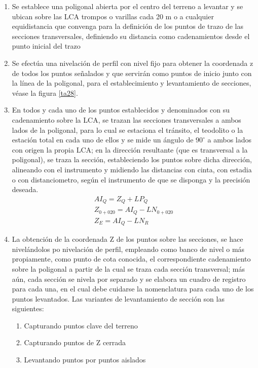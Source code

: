 \begin{enumerate}
    \item Se establece una poligonal abierta por el centro del terreno a levantar y se ubican sobre las LCA trompos o varillas cada 20 m o a cualquier equidistancia que convenga para la definición de los puntos de trazo de las secciones transversales, definiendo su distancia como cadenamientos desde el punto inicial del trazo 
    \item Se efectúa una nivelación de perfil con nivel fijo para obtener la coordenada z de todos los puntos señalados y que servirán como puntos de inicio junto con la línea de la poligonal, para el establecimiento y levantamiento de secciones, véase la figura \ref{ta28}.
    \item En todos y cada uno de los puntos establecidos y denominados con su cadenamiento sobre la LCA, se trazan las secciones transversales a ambos lados de la poligonal, para lo cual se estaciona el tránsito, el teodolito o la estación total en cada uno de ellos y se mide un ángulo de $90^{\circ}$ a ambos lados con origen la propia LCA; en la dirección resultante (que es transversal a la poligonal), se traza la sección, estableciendo los puntos sobre dicha dirección, alineando con el instrumento y midiendo las distancias con cinta, con estadia o con distanciometro, según el instrumento de que se disponga y la precisión deseada.
    \begin{align}
        AI_Q=Z_Q+LP_Q\\
        Z_{0+020}=AI_Q-LN_{0+020}\\
        Z_E=AI_Q-LN_R
    \end{align} 
    \item La obtención de la coordenada Z de los puntos sobre las secciones, se hace nivelándolos po nivelación de perfil, empleando como banco de nivel o más propiamente, como punto de cota conocida, el correspondiente cadenamiento sobre la poligonal a partir de la cual se traza cada sección transversal; más aún, cada sección se nivela por separado y se elabora un cuadro de registro para cada una, en el cual debe cuidarse la nomenclatura para cada uno de los puntos levantados. Las variantes de levantamiento de sección son las siguientes: \begin{enumerate}
        \item Capturando puntos clave del terreno
        \item Capturando puntos de Z cerrada
        \item Levantando puntos por puntos aislados
    \end{enumerate}    
\end{enumerate}


